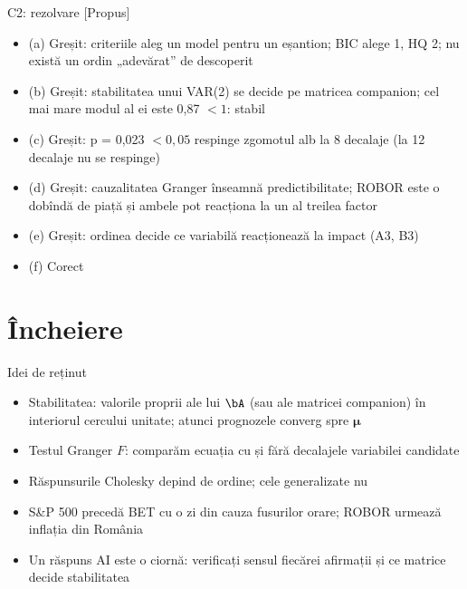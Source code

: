 \ifsolutions
\begin{frame}{C2: rezolvare [Propus]}
\itemsize{\scriptsize}
\begin{itemize}
    \item (a) Greșit: criteriile aleg un model pentru un eșantion; BIC alege 1, HQ 2; nu există un ordin „adevărat” de descoperit
    \item (b) Greșit: stabilitatea unui VAR(2) se decide pe matricea companion; cel mai mare modul al ei este 0{,}87 $< 1$: stabil
    \item (c) Greșit: p = 0{,}023 $< 0{,}05$ respinge zgomotul alb la 8 decalaje (la 12 decalaje nu se respinge)
    \item (d) Greșit: cauzalitatea Granger înseamnă predictibilitate; ROBOR este o dobîndă de piață și ambele pot reacționa la un al treilea factor
    \item (e) Greșit: ordinea decide ce variabilă reacționează la impact (A3, B3)
    \item (f) Corect
\end{itemize}
\end{frame}
\fi


\section{Încheiere}

\begin{frame}{Idei de reținut}
\itemsize{\small}
\begin{itemize}
    \item Stabilitatea: valorile proprii ale lui $\bA$ (sau ale matricei companion) în interiorul cercului unitate; atunci prognozele converg spre $\boldsymbol{\mu}$
    \item Testul Granger $F$: comparăm ecuația cu și fără decalajele variabilei candidate
    \item Răspunsurile Cholesky depind de ordine; cele generalizate nu
    \item S\&P 500 precedă BET cu o zi din cauza fusurilor orare; ROBOR urmează inflația din România
    \item Un răspuns AI este o ciornă: verificați sensul fiecărei afirmații și ce matrice decide stabilitatea
\end{itemize}
\end{frame}

